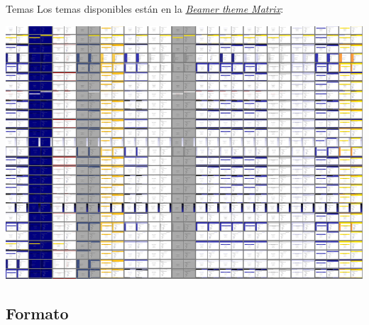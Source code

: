 \begin{frame}{Temas}
  Los temas disponibles están en la \href{http://www.hartwork.org/beamer-theme-matrix}{\textit{Beamer theme Matrix}}:

  \begin{center}
    \includegraphics[width=.9\textwidth]{./img/theme-matrix.png}
  \end{center}
  \espacio
\end{frame}

\subsection{Formato}

